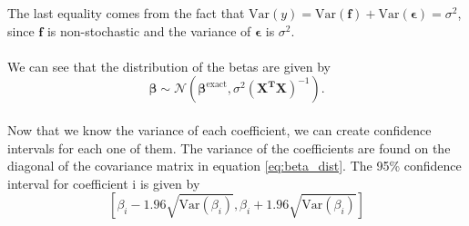 The last equality comes from the fact that $\text{Var}(y) = \text{Var}(\boldsymbol{f}) + \text{Var}(\boldsymbol{\epsilon}) = \sigma^2$, since $\boldsymbol{f}$ is non-stochastic and the variance of $\boldsymbol{\epsilon}$ is $\sigma^2$.
\\
\\
We can see that the distribution of the betas are given by 
\begin{equation}
    \boldsymbol{\beta} \sim \mathcal{N}(\boldsymbol{\beta}^{\text{exact}}, \sigma^2(\boldsymbol{X^TX})^{-1}). 
    \label{eq:beta_dist}
\end{equation}
\\
Now that we know the variance of each coefficient, we can create confidence intervals for each one of them. The variance of the coefficients are found on the diagonal of the covariance matrix in equation \ref{eq:beta_dist}. The 95\% confidence interval for coefficient i is given by 
\begin{equation}
    \left[\beta_i - 1.96\sqrt{\text{Var}(\beta_i)}, \beta_i + 1.96\sqrt{\text{Var}(\beta_i)}\right]
\end{equation}
\\


